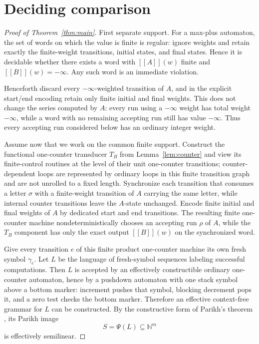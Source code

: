 \documentclass[11pt]{article}
\newcommand{\minf}{-\infty}
\newcommand{\eval}[1]{[\![#1]\!]}
\begin{document}
\section{Deciding comparison}

\begin{proof}[Proof of Theorem~\ref{thm:main}]
First separate support. For a max-plus automaton, the set of words on which the value is finite is regular: ignore weights and retain exactly the finite-weight transitions, initial states, and final states. Hence it is decidable whether there exists a word with $\eval{A}(w)$ finite and $\eval{B}(w)=\minf$. Any such word is an immediate violation.

Henceforth discard every $\minf$-weighted transition of $A$, and in the explicit start/end encoding retain only finite initial and final weights. This does not change the series computed by $A$: every run using a $\minf$ weight has total weight $\minf$, while a word with no remaining accepting run still has value $\minf$. Thus every accepting run considered below has an ordinary integer weight.

Assume now that we work on the common finite support. Construct the functional one-counter transducer $T_B$ from Lemma~\ref{lem:counter} and view its finite-control routines at the level of their unit one-counter transitions; counter-dependent loops are represented by ordinary loops in this finite transition graph and are not unrolled to a fixed length. Synchronize each transition that consumes a letter $\sigma$ with a finite-weight transition of $A$ carrying the same letter, while internal counter transitions leave the $A$-state unchanged. Encode finite initial and final weights of $A$ by dedicated start and end transitions. The resulting finite one-counter machine nondeterministically chooses an accepting run $\rho$ of $A$, while the $T_B$ component has only the exact output $\eval{B}(w)$ on the synchronized word.

Give every transition $e$ of this finite product one-counter machine its own fresh symbol $\gamma_e$. Let $L$ be the language of fresh-symbol sequences labeling successful computations. Then $L$ is accepted by an effectively constructible ordinary one-counter automaton, hence by a pushdown automaton with one stack symbol above a bottom marker: increment pushes that symbol, blocking decrement pops it, and a zero test checks the bottom marker. Therefore an effective context-free grammar for $L$ can be constructed. By the constructive form of Parikh's theorem \cite{Parikh1966,KopczynskiTo2010}, its Parikh image
\[
  S=\Psi(L)\subseteq\mathbb N^m
\]
is effectively semilinear.


\end{proof}
\end{document}
